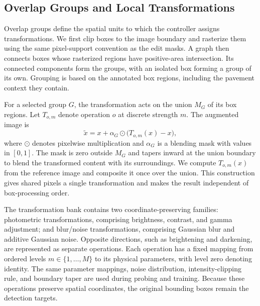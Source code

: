 \documentclass[conference]{IEEEtran}
\begin{document}
\subsection{Overlap Groups and Local Transformations}
\label{sec:method_groups}
Overlap groups define the spatial units to which the controller assigns transformations. We first clip boxes to the image boundary and rasterize them using the same pixel-support convention as the edit masks. A graph then connects boxes whose rasterized regions have positive-area intersection. Its connected components form the groups, with an isolated box forming a group of its own. Grouping is based on the annotated box regions, including the pavement context they contain.

For a selected group $G$, the transformation acts on the union $M_G$ of its box regions. Let $T_{o,m}$ denote operation $o$ at discrete strength $m$. The augmented image is
\begin{equation}
    \widetilde{x}=x+\alpha_G\odot\bigl(T_{o,m}(x)-x\bigr),
    \label{eq:local_edit}
\end{equation}
where $\odot$ denotes pixelwise multiplication and $\alpha_G$ is a blending mask with values in $[0,1]$. The mask is zero outside $M_G$ and tapers inward at the union boundary to blend the transformed content with its surroundings. We compute $T_{o,m}(x)$ from the reference image and composite it once over the union. This construction gives shared pixels a single transformation and makes the result independent of box-processing order.

The transformation bank contains two coordinate-preserving families: photometric transformations, comprising brightness, contrast, and gamma adjustment; and blur/noise transformations, comprising Gaussian blur and additive Gaussian noise. Opposite directions, such as brightening and darkening, are represented as separate operations. Each operation has a fixed mapping from ordered levels $m\in\{1,\ldots,M\}$ to its physical parameters, with level zero denoting identity. The same parameter mappings, noise distribution, intensity-clipping rule, and boundary taper are used during probing and training. Because these operations preserve spatial coordinates, the original bounding boxes remain the detection targets.
\end{document}
